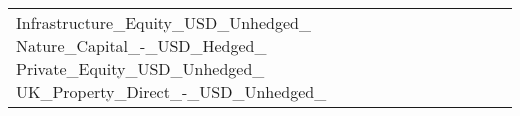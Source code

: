 \begin{tabular}{lrrrrrrrrr}
Infrastructure_Equity_USD_Unhedged_%
Nature_Capital_-_USD_Hedged_%
Private_Equity_USD_Unhedged_%
UK_Property_Direct_-_USD_Unhedged_%
\end{tabular}
